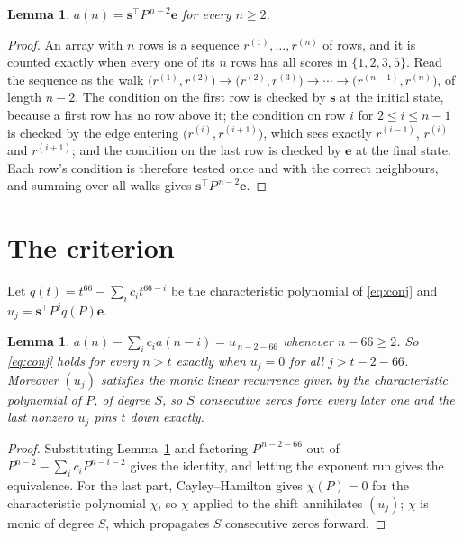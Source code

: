 \documentclass[11pt,a4paper]{article}
\theoremstyle{plain}
\newtheorem{lemma}[theorem]{Lemma}
\theoremstyle{definition}
\begin{document}
\begin{lemma}\label{lem:walk}
$a(n)=\mathbf{s}^{\!\top}P^{\,n-2}\mathbf{e}$ for every $n\ge2$.
\end{lemma}

\begin{proof}
An array with $n$ rows is a sequence $r^{(1)},\dots,r^{(n)}$ of rows, and it is counted
exactly when every one of its $n$ rows has all scores in $\{1,2,3,5\}$. Read the sequence as the
walk $\bigl(r^{(1)},r^{(2)}\bigr)\to\bigl(r^{(2)},r^{(3)}\bigr)\to\cdots\to
\bigl(r^{(n-1)},r^{(n)}\bigr)$, of length $n-2$. The condition on the first row is
checked by $\mathbf{s}$ at the initial state, because a first row has no row above it; the
condition on row $i$ for $2\le i\le n-1$ is checked by the edge entering
$\bigl(r^{(i)},r^{(i+1)}\bigr)$, which sees exactly $r^{(i-1)}$, $r^{(i)}$ and
$r^{(i+1)}$; and the condition on the last row is checked by $\mathbf{e}$ at the final
state. Each row's condition is therefore tested once and with the correct neighbours, and
summing over all walks gives $\mathbf{s}^{\!\top}P^{\,n-2}\mathbf{e}$.
\end{proof}

\section{The criterion}

Let $q(t)=t^{66}-\sum_i c_i t^{66-i}$ be the characteristic polynomial of
\eqref{eq:conj} and $u_j=\mathbf{s}^{\!\top}P^{j}q(P)\mathbf{e}$.

\begin{lemma}\label{lem:crit}
$a(n)-\sum_i c_i a(n-i)=u_{\,n-2-66}$ whenever $n-66\ge2$. So \eqref{eq:conj}
holds for every $n>t$ exactly when $u_j=0$ for all $j>t-2-66$. Moreover $(u_j)$
satisfies the monic linear recurrence given by the characteristic polynomial of $P$, of
degree $S$, so $S$ consecutive zeros force every later one and the last nonzero $u_j$ pins
$t$ down exactly.
\end{lemma}

\begin{proof}
Substituting Lemma~\ref{lem:walk} and factoring $P^{\,n-2-66}$ out of
$P^{n-2}-\sum_i c_i P^{n-i-2}$ gives the identity, and letting the exponent run gives the
equivalence. For the last part, Cayley--Hamilton gives $\chi(P)=0$ for the characteristic
polynomial $\chi$, so $\chi$ applied to the shift annihilates $(u_j)$; $\chi$ is monic of
degree $S$, which propagates $S$ consecutive zeros forward.
\end{proof}
\end{document}
